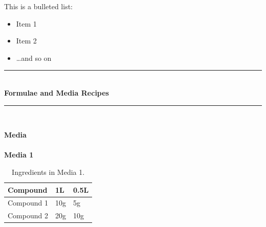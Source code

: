 \documentclass[idxtotoc,hyperref,openany]{labbook} %
\newcommand{\HRule}{\rule{\linewidth}{0.5mm}} %
\begin{document}



This is a bulleted list:

\begin{itemize}
\item Item 1
\item Item 2
\item \ldots and so on
\end{itemize}



\lipsum[6]



\lipsum[7]


\labday{} %

\begin{center}
\HRule \\[0.4cm]
{\huge \textbf{Formulae and Media Recipes}}\\[0.4cm] %
\HRule \\[1.5cm]
\end{center}


\newpage

\huge \textbf{Media} \\ \\

\normalsize \textbf{Media 1}\\
\begin{table}[H]
\begin{tabular}{l l l}
\toprule
\textbf{Compound} & \textbf{1L} & \textbf{0.5L}\\
\toprule
Compound 1 & 10g & 5g\\
Compound 2 & 20g & 10g\\
\bottomrule
\end{tabular}
\caption{Ingredients in Media 1.}
\label{tab:med1}
\end{table}
\end{document}

